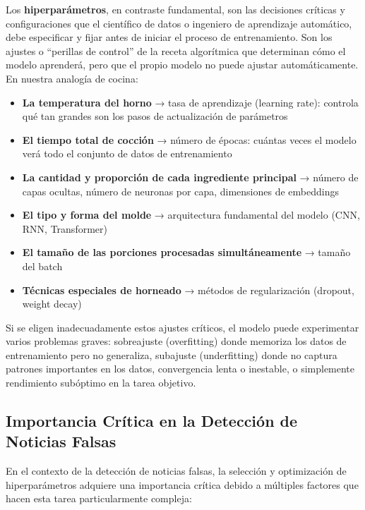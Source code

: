Los \textbf{hiperparámetros}, en contraste fundamental, son las decisiones críticas y configuraciones que el científico de datos o ingeniero de aprendizaje automático, debe especificar y fijar antes de iniciar el proceso de entrenamiento. Son los ajustes o ``perillas de control'' de la receta algorítmica que determinan cómo el modelo aprenderá, pero que el propio modelo no puede ajustar automáticamente. En nuestra analogía de cocina:

\begin{itemize}
    \item \textbf{La temperatura del horno} → tasa de aprendizaje (learning rate): controla qué tan grandes son los pasos de actualización de parámetros
    \item \textbf{El tiempo total de cocción} → número de épocas: cuántas veces el modelo verá todo el conjunto de datos de entrenamiento
    \item \textbf{La cantidad y proporción de cada ingrediente principal} → número de capas ocultas, número de neuronas por capa, dimensiones de embeddings
    \item \textbf{El tipo y forma del molde} → arquitectura fundamental del modelo (CNN, RNN, Transformer)
    \item \textbf{El tamaño de las porciones procesadas simultáneamente} → tamaño del batch
    \item \textbf{Técnicas especiales de horneado} → métodos de regularización (dropout, weight decay)
\end{itemize}

Si se eligen inadecuadamente estos ajustes críticos, el modelo puede experimentar varios problemas graves: sobreajuste (overfitting) donde memoriza los datos de entrenamiento pero no generaliza, subajuste (underfitting) donde no captura patrones importantes en los datos, convergencia lenta o inestable, o simplemente rendimiento subóptimo en la tarea objetivo.

\subsection{Importancia Crítica en la Detección de Noticias Falsas}

En el contexto de la detección de noticias falsas, la selección y optimización de hiperparámetros adquiere una importancia crítica debido a múltiples factores que hacen esta tarea particularmente compleja:

